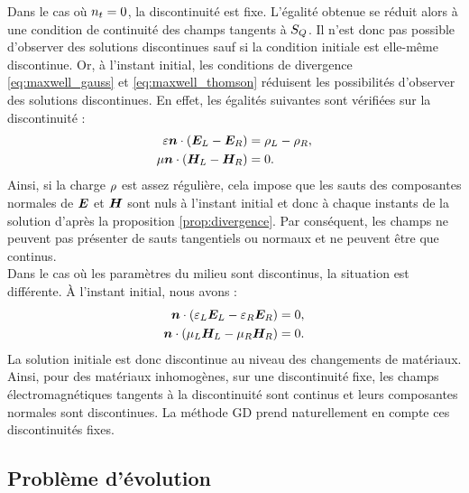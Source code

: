 Dans le cas où $n_{t} = 0$, la discontinuité est fixe. L’égalité obtenue se réduit
alors à une condition de continuité des champs tangents à $S_Q$. Il n’est donc
pas possible d’observer des solutions discontinues sauf si la condition initiale est
elle-même discontinue. Or, à l’instant initial, les conditions de divergence
\eqref{eq:maxwell_gauss} et \eqref{eq:maxwell_thomson} réduisent les possibilités
d’observer des solutions discontinues.
En effet, les égalités suivantes sont vérifiées sur la discontinuité :
\begin{subequations}
	\begin{align}
		\varepsilon \bm{n} \cdot (\bm{E}_L - \bm{E}_R) &= \rho_L - \rho_R , \\
		\mu \bm{n} \cdot (\bm{H}_L - \bm{H}_R) &= 0 .
	\end{align}
\end{subequations}
Ainsi, si la charge $\rho$ est assez régulière,
cela impose que les sauts des composantes normales de $\bm{E}$ et $\bm{H}$ sont nuls
à l’instant initial et donc à chaque instants de la solution d'après la
proposition \ref{prop:divergence}. Par conséquent, les champs ne peuvent pas présenter de sauts
tangentiels ou normaux et ne peuvent être que continus.
\\

Dans le cas où les paramètres du milieu sont discontinus, la situation est
différente. À l’instant initial, nous avons :
\begin{subequations}
	\begin{align}
	\bm{n} \cdot (\varepsilon_L \bm{E}_L - \varepsilon_R \bm{E}_R) &= 0 , \\
	\bm{n} \cdot (\mu_L \bm{H}_L - \mu_R \bm{H}_R) &= 0 .
	\end{align}
\end{subequations}
La solution initiale est donc discontinue au niveau des changements de matériaux.
Ainsi, pour des matériaux inhomogènes, sur une discontinuité fixe, les champs
électromagnétiques tangents à la discontinuité sont continus et leurs composantes
normales sont discontinues.
La méthode GD prend naturellement en compte ces discontinuités fixes.
\\




\subsection{Problème d'évolution}
\label{ssect:systeme_de_friedrichs_pb_evol}

